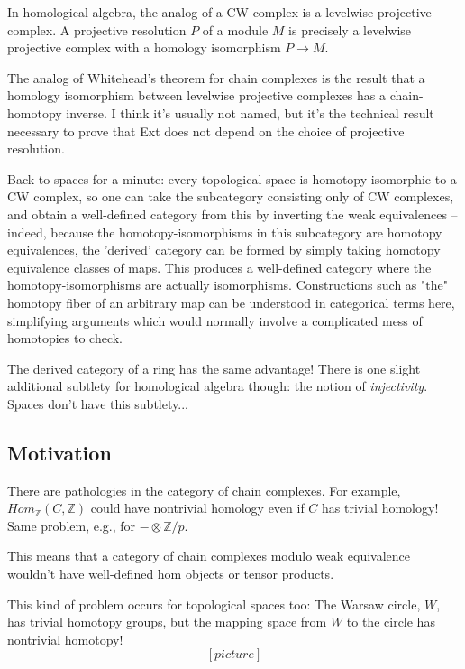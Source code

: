 \documentclass[nooutcomes]{ximera}
\begin{document}
In homological algebra, the analog of a CW complex is a levelwise
projective complex.  A projective resolution $P$ of a module $M$ is
precisely a levelwise projective complex with a homology isomorphism
$P \to M$.

The analog of Whitehead's theorem for chain complexes is the result
that a homology isomorphism between levelwise projective complexes has
a chain-homotopy inverse.  I think it's usually not named, but it's
the technical result necessary to prove that Ext does not depend on
the choice of projective resolution.


Back to spaces for a minute: every topological space is
homotopy-isomorphic to a CW complex, so one can take the subcategory
consisting only of CW complexes, and obtain a well-defined category
from this by inverting the weak equivalences -- indeed, because the
homotopy-isomorphisms in this subcategory are homotopy equivalences,
the 'derived' category can be formed by simply taking homotopy
equivalence classes of maps.  This produces a well-defined category
where the homotopy-isomorphisms are actually isomorphisms.
Constructions such as "the" homotopy fiber of an arbitrary map can be
understood in categorical terms here, simplifying arguments which
would normally involve a complicated mess of homotopies to check.

The derived category of a ring has the same advantage!  There is one
slight additional subtlety for homological algebra though: the notion
of \emph{injectivity}.  Spaces don't have this subtlety...





\subsection{Motivation}

There are pathologies in the category of chain complexes.  For
example, $Hom_{\mathbb{Z}}(C, \mathbb{Z})$ could have nontrivial
homology even if $C$ has trivial homology!  Same problem, e.g., for $-
\otimes \mathbb{Z}/p$.

This means that a category of chain complexes modulo weak equivalence
wouldn't have well-defined hom objects or tensor products.

This kind of problem occurs for topological spaces too:  The Warsaw
circle, $W$, has trivial homotopy groups, but the mapping space from
$W$ to the circle has nontrivial homotopy!
\[
[picture]
\]
\end{document}
